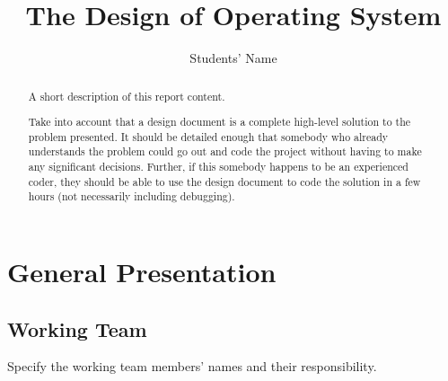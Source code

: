 \documentclass[a4paper,12pt]{report}
\title{The Design of \OSName{} Operating System}
\author{Students' Name}
\begin{document}


\maketitle

\begin{abstract}
	A short description of this report content. 
	
	Take into account that a design document is a complete high-level solution to the problem presented. It should be detailed enough that somebody who already understands the problem could go out and code the project without having to make any significant decisions. Further, if this somebody happens to be an experienced coder, they should be able to use the design document to code the solution in a few hours (not necessarily including debugging). 
\end{abstract}


\chapter{General Presentation}

\section{Working Team}

Specify the working team members' names and their responsibility.
\end{document}
